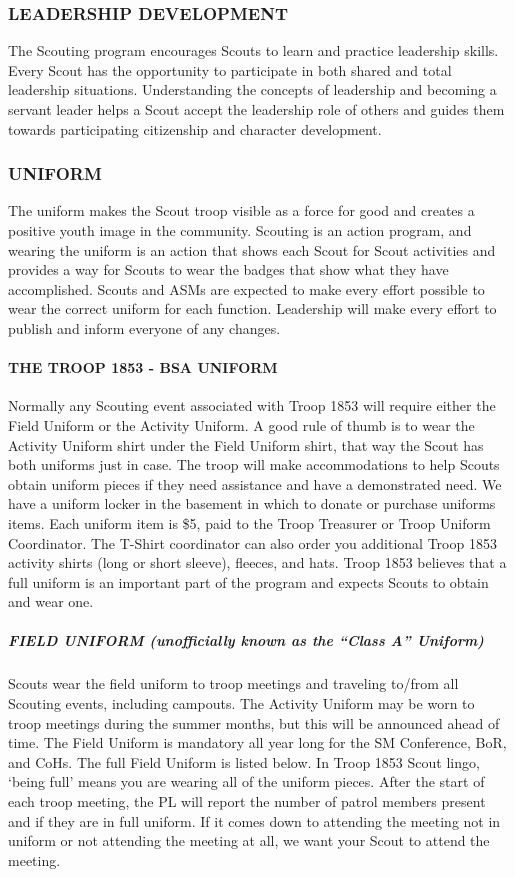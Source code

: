 \documentclass{ltxguide}
\begin{document}
\subsubsection{LEADERSHIP DEVELOPMENT}
The Scouting program encourages Scouts to learn and practice leadership skills. Every Scout has the opportunity to participate in both shared and total leadership situations. Understanding the concepts of leadership and becoming a servant leader helps a Scout accept the leadership role of others and guides them towards participating citizenship and character development.

\subsubsection{UNIFORM}
The uniform makes the Scout troop visible as a force for good and creates a positive youth image in the community. Scouting is an action program, and wearing the uniform is an action that shows each Scout for Scout activities and provides a way for Scouts to wear the badges that show what they have accomplished. Scouts and \acp{ASM} are expected to make every effort possible to wear the correct uniform for each function. Leadership will make every effort to publish and inform everyone of any changes. 

\paragraph{THE TROOP 1853 - \ac{BSA} UNIFORM}
Normally any Scouting event associated with Troop 1853 will require either the Field Uniform or the Activity Uniform. A good rule of thumb is to wear the Activity Uniform shirt under the Field Uniform shirt, that way the Scout has both uniforms just in case. The troop will make accommodations to help Scouts obtain uniform pieces if they need assistance and have a demonstrated need. We have a uniform locker in the basement in which to donate or purchase uniforms items. Each uniform item is \$5, paid to the Troop Treasurer or Troop Uniform Coordinator. The T-Shirt coordinator can also order you additional Troop 1853 activity shirts (long or short sleeve), fleeces, and hats. Troop 1853 believes that a full uniform is an important part of the program and expects Scouts to obtain and wear one.

\subparagraph{FIELD UNIFORM (unofficially known as the “Class A” Uniform)}
Scouts wear the field uniform to troop meetings and traveling to/from all Scouting events, including campouts. The Activity Uniform may be worn to troop meetings during the summer months, but this will be announced ahead of time. The Field Uniform is mandatory all year long for the \ac{SM} Conference, \ac{BoR}, and \acp{CoH}. The full Field Uniform is listed below. In Troop 1853 Scout lingo, ‘being full' means you are wearing all of the uniform pieces. After the start of each troop meeting, the \ac{PL} will report the number of patrol members present and if they are in full uniform. If it comes down to attending the meeting not in uniform or not attending the meeting at all, we want your Scout to attend the meeting.
\end{document}
